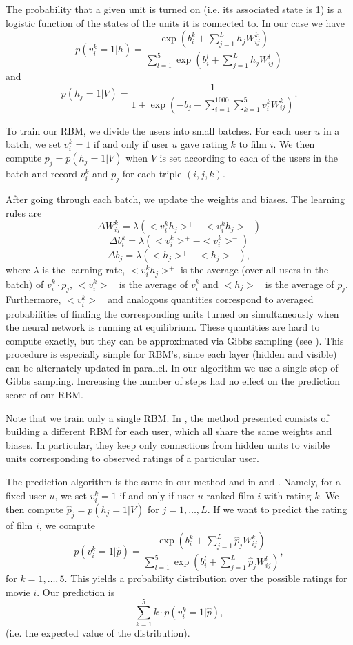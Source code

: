 \documentclass[10pt,conference,compsocconf]{IEEEtran}
\begin{document}
The probability that a given unit is turned on (i.e. its associated state is 1) is a logistic function of the states of the units it is connected to. In our case we have
\[
p(v^k_i=1|h)=\frac{\exp(b^k_i+\sum_{j=1}^L h_jW^k_{ij})}{\sum_{l=1}^{5}\exp(b^l_i+\sum_{j=1}^{L}h_jW^l_{ij})}
\]
and
\[
p(h_j=1|V)=\frac{1}{1+\exp(-b_j-\sum_{i=1}^{1000}\sum_{k=1}^{5}v^k_iW^k_{ij})}.
\]

To train our RBM, we divide the users into small batches. For each user $u$ in a batch, we set $v^k_i=1$ if and only if user $u$ gave rating $k$ to film $i$. We then compute $p_j=p(h_j=1|V)$ when $V$ is set according to each of the users in the batch and record $v^k_i$ and $p_j$ for each triple $(i,j,k)$.

After going through each batch, we update the weights and biases. The learning rules are
\[
\Delta W^k_{ij}=\lambda(<v^k_ih_j>^+-<v^k_ih_j>^-)
\]
\[
\Delta b^k_i = \lambda(<v^k_i>^+-<v^k_i>^-)
\]
\[
\Delta b_j = \lambda(<h_j>^+-<h_j>^-),
\]
where $\lambda$ is the learning rate, $<v^k_ih_j>^+$ is the average (over all users in the batch) of $v^k_i\cdot p_j$, $<v^k_i>^+$ is the average of $v^k_i$ and $<h_j>^+$ is the average of $p_j$. Furthermore, $<v^k_i>^-$ and analogous quantities correspond to averaged probabilities of finding the corresponding units turned on simultaneously  when the neural network is running at equilibrium. These quantities are hard to compute exactly, but they can be approximated via Gibbs sampling (see \cite{H02}). This procedure is especially simple for RBM's, since each layer (hidden and visible) can be alternately updated in parallel. In our algorithm we use a single step of Gibbs sampling. Increasing the number of steps had no effect on the prediction score of our RBM.

Note that we train only a single RBM. In \cite{SMH07}, the method presented consists of building a different RBM for each user, which all share the same weights and biases. In particular, they keep only connections from hidden units to visible units corresponding to observed ratings of a particular user.

The prediction algorithm is the same in our method and in \cite{SMH07} and \cite{L10}. Namely, for a fixed user $u$, we set $v^k_i=1$ if and only if user $u$ ranked film $i$ with rating $k$. We then compute $\hat{p}_j=p(h_j=1|V)$ for $j=1,\dots, L$. If we want to predict the rating of film $i$, we compute
\[
p(v^k_i=1|\hat{p})=\frac{\exp(b^k_i+\sum_{j=1}^L \hat{p}_jW^k_{ij})}{\sum_{l=1}^{5}\exp(b^l_i+\sum_{j=1}^{L}\hat{p}_jW^l_{ij})},
\]
for $k=1,\dots, 5$. This yields a probability distribution over the possible ratings for movie $i$. Our prediction is 
\[
\sum_{k=1}^{5}k\cdot p(v^k_i=1|\hat{p}),
\]
(i.e. the expected value of the distribution).
\end{document}
